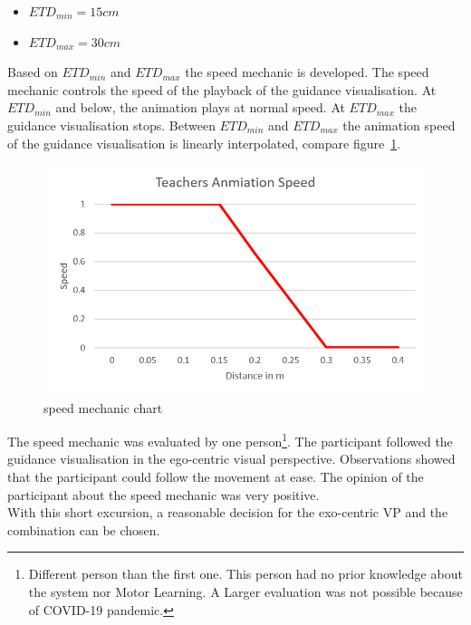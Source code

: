 \begin{itemize}
	\item[] $ETD_{min}=15cm$
	\item[] $ETD_{max}=30cm$
\end{itemize}
Based on $ETD_{min}$ and  $ETD_{max}$ the speed mechanic is developed. The speed mechanic controls the speed of the playback of the guidance visualisation. At $ETD_{min}$ and below, the animation plays at normal speed. At $ETD_{max}$ the guidance visualisation stops. Between $ETD_{min}$ and $ETD_{max}$ the animation speed of the guidance visualisation is linearly interpolated, compare figure~\ref{fig:speed_mechanic}.
\begin{figure}[htb]
	\centering
	\includegraphics[width=\textwidth]{figures/speed_mechanic_chart.png}
	\caption[speed mechanic chart]{speed mechanic chart}
	\label{fig:speed_mechanic}
\end{figure}
The speed mechanic was evaluated by one person\footnote{Different person than the first one. This person had no prior knowledge about the system nor Motor Learning. A Larger evaluation was not possible because of COVID-19 pandemic.}. The participant followed the guidance visualisation in the ego-centric visual perspective. Observations showed that the participant could follow the movement at ease. The opinion of the participant about the speed mechanic was very positive.\\
With this short excursion, a reasonable decision for the exo-centric VP and the combination can be chosen.\\
\hspace{1cm}


